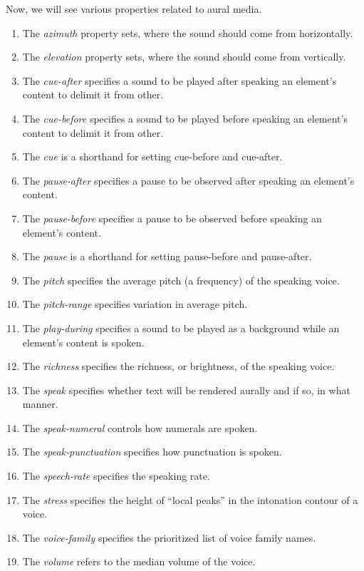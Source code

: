 \documentclass[a4paper,oneside]{book}
\numberwithin{equation}{chapter}
\begin{document}
Now, we will see various properties related to aural media.
\begin{enumerate}
\item The \textit{azimuth} property sets, where the sound should come from horizontally.
\item The \textit{elevation} property sets, where the sound should come from vertically.
\item The \textit{cue-after} specifies a sound to be played after speaking an element's content to delimit it from other.
\item The \textit{cue-before} specifies a sound to be played before speaking an element's content to delimit it from other.
\item The \textit{cue} is a shorthand for setting cue-before and cue-after.
\item The \textit{pause-after} specifies a pause to be observed after speaking an element's content.
\item The \textit{pause-before} specifies a pause to be observed before speaking an element's content.
\item The \textit{pause} is a shorthand for setting pause-before and pause-after.
\item The \textit{pitch} specifies the average pitch (a frequency) of the speaking voice.
\item The \textit{pitch-range} specifies variation in average pitch.
\item The \textit{play-during} specifies a sound to be played as a background while an element's content is spoken.
\item The \textit{richness} specifies the richness, or brightness, of the speaking voice.
\item The \textit{speak} specifies whether text will be rendered aurally and if so, in what manner.
\item The \textit{speak-numeral} controls how numerals are spoken.
\item The \textit{speak-punctuation} specifies how punctuation is spoken.
\item The \textit{speech-rate} specifies the speaking rate.
\item The \textit{stress} specifies the height of ``local peaks'' in the intonation contour of a voice.
\item The \textit{voice-family} specifies the prioritized list of voice family names.
\item The \textit{volume} refers to the median volume of the voice.
\end{enumerate}
\end{document}
